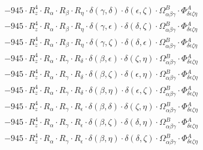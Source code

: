\documentclass{article}
\begin{document}
\begin{equation}
\begin{array}{c}
 \\[0.2em] 		 - 945 \cdot R_{z}^{4} \cdot R_{\alpha{}} \cdot R_{\beta{}} \cdot R_{\eta{}} \cdot \delta{}\left(\gamma{}, \delta{}\right) \cdot \delta{}\left(\epsilon{}, \zeta{}\right) \cdot \Omega{}^{B}_{\alpha{}\beta{}\gamma{}} \cdot \Phi{}^{A}_{\delta{}\epsilon{}\zeta{}\eta{}} 
 \\[0.2em] 		 - 945 \cdot R_{z}^{4} \cdot R_{\alpha{}} \cdot R_{\beta{}} \cdot R_{\eta{}} \cdot \delta{}\left(\gamma{}, \epsilon{}\right) \cdot \delta{}\left(\delta{}, \zeta{}\right) \cdot \Omega{}^{B}_{\alpha{}\beta{}\gamma{}} \cdot \Phi{}^{A}_{\delta{}\epsilon{}\zeta{}\eta{}} 
 \\[0.2em] 		 - 945 \cdot R_{z}^{4} \cdot R_{\alpha{}} \cdot R_{\beta{}} \cdot R_{\eta{}} \cdot \delta{}\left(\gamma{}, \zeta{}\right) \cdot \delta{}\left(\delta{}, \epsilon{}\right) \cdot \Omega{}^{B}_{\alpha{}\beta{}\gamma{}} \cdot \Phi{}^{A}_{\delta{}\epsilon{}\zeta{}\eta{}} 
 \\[0.2em] 		 - 945 \cdot R_{z}^{4} \cdot R_{\alpha{}} \cdot R_{\gamma{}} \cdot R_{\delta{}} \cdot \delta{}\left(\beta{}, \epsilon{}\right) \cdot \delta{}\left(\zeta{}, \eta{}\right) \cdot \Omega{}^{B}_{\alpha{}\beta{}\gamma{}} \cdot \Phi{}^{A}_{\delta{}\epsilon{}\zeta{}\eta{}} 
 \\[0.2em] 		 - 945 \cdot R_{z}^{4} \cdot R_{\alpha{}} \cdot R_{\gamma{}} \cdot R_{\delta{}} \cdot \delta{}\left(\beta{}, \zeta{}\right) \cdot \delta{}\left(\epsilon{}, \eta{}\right) \cdot \Omega{}^{B}_{\alpha{}\beta{}\gamma{}} \cdot \Phi{}^{A}_{\delta{}\epsilon{}\zeta{}\eta{}} 
 \\[0.2em] 		 - 945 \cdot R_{z}^{4} \cdot R_{\alpha{}} \cdot R_{\gamma{}} \cdot R_{\delta{}} \cdot \delta{}\left(\beta{}, \eta{}\right) \cdot \delta{}\left(\epsilon{}, \zeta{}\right) \cdot \Omega{}^{B}_{\alpha{}\beta{}\gamma{}} \cdot \Phi{}^{A}_{\delta{}\epsilon{}\zeta{}\eta{}} 
 \\[0.2em] 		 - 945 \cdot R_{z}^{4} \cdot R_{\alpha{}} \cdot R_{\gamma{}} \cdot R_{\epsilon{}} \cdot \delta{}\left(\beta{}, \delta{}\right) \cdot \delta{}\left(\zeta{}, \eta{}\right) \cdot \Omega{}^{B}_{\alpha{}\beta{}\gamma{}} \cdot \Phi{}^{A}_{\delta{}\epsilon{}\zeta{}\eta{}} 
 \\[0.2em] 		 - 945 \cdot R_{z}^{4} \cdot R_{\alpha{}} \cdot R_{\gamma{}} \cdot R_{\epsilon{}} \cdot \delta{}\left(\beta{}, \zeta{}\right) \cdot \delta{}\left(\delta{}, \eta{}\right) \cdot \Omega{}^{B}_{\alpha{}\beta{}\gamma{}} \cdot \Phi{}^{A}_{\delta{}\epsilon{}\zeta{}\eta{}} 
 \\[0.2em] 		 - 945 \cdot R_{z}^{4} \cdot R_{\alpha{}} \cdot R_{\gamma{}} \cdot R_{\epsilon{}} \cdot \delta{}\left(\beta{}, \eta{}\right) \cdot \delta{}\left(\delta{}, \zeta{}\right) \cdot \Omega{}^{B}_{\alpha{}\beta{}\gamma{}} \cdot \Phi{}^{A}_{\delta{}\epsilon{}\zeta{}\eta{}} 

\end{array}
\end{equation}
\end{document}
